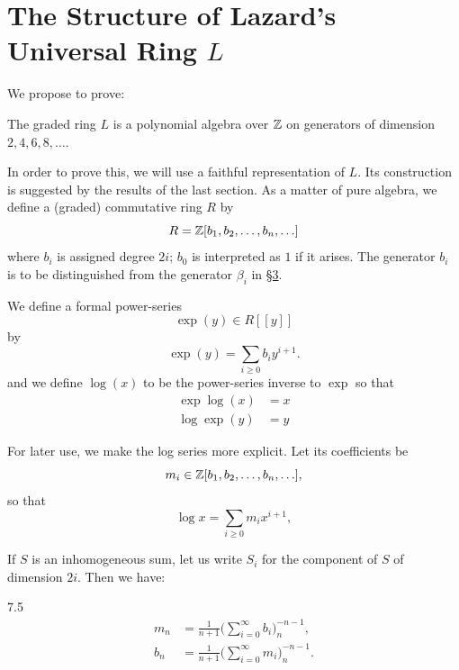 \documentclass[../main]{subfiles}
\begin{document}
\chapter{The Structure of Lazard's Universal Ring \texorpdfstring{$L$}{L}}
\label{sec:p2c7}
We propose to prove: 

\begin{theorem}
\label{thm:p2c07.1}
The graded ring $L$ is a polynomial algebra over $\mathbb{Z}$ on generators of dimension $2, 4, 6, 8, \ldots$.
\end{theorem}

In order to prove this, we will use a faithful representation of $L$. Its construction is suggested by the results of the last section. As a matter of pure algebra, we define a (graded) commutative ring $R$ by \[R = \mathbb{Z}[b_1, b_2, \ldots, b_n, \ldots]\] where $b_i$ is assigned degree $2i$; $b_0$ is interpreted as $1$ if it arises. The generator $b_i$ is to be distinguished from the generator $\beta_i$ in \hyperref[sec:p2c3]{\S 3}.

We define a formal power-series \[\exp(y) \in R[[y]]\] by
\begin{equation}
\tag{7.2} 
\label{eqn:p2c07.2}
\exp(y) = \sum_{i \ge 0} b_i y^{i + 1}.
\end{equation}
and we define $\log(x)$ to be the power-series inverse to $\exp$ so that
\begin{equation}
\tag{7.3}
\label{eqn:p2c07.3}
\begin{split}
\exp \log(x) & = x \\
\log \exp(y) & = y
\end{split}
\end{equation}

For later use, we make the log series more explicit. Let its coefficients be \[m_i \in \mathbb{Z} [b_1, b_2, \ldots, b_n, \ldots],\] so that 
\begin{equation}
\tag{7.4}
\label{eqn:p2c07.4}
\log x = \sum_{i \ge 0} m_i x^{i + 1},
\end{equation}

If $S$ is an inhomogeneous sum, let us write $S_i$ for the component of $S$ of dimension $2i$. Then we have: 

\begin{customprop}{7.5}
\label{prop:p2c07.5}
\begin{align*}m_n & = \frac 1 {n + 1} \bigg(\sum_{i = 0}^\infty b_i\bigg)_n^{-n-1}, \\ b_n & = \frac 1 {n + 1} \bigg(\sum_{i = 0}^\infty m_i\bigg)_n^{-n-1}.\end{align*}
\end{customprop}
\end{document}
